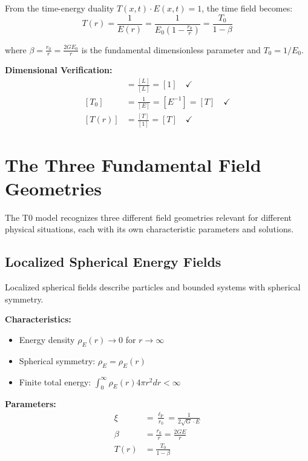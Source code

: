 \documentclass[12pt,a4paper]{report}
\newcommand{\lP}{\ell_{\text{P}}}         %
\newcommand{\rzero}{r_0}                  %
\begin{document}
	From the time-energy duality $T(x,t) \cdot E(x,t) = 1$, the time field becomes:
	\begin{equation}
		T(r) = \frac{1}{E(r)} = \frac{1}{E_0\left(1 - \frac{\rzero}{r}\right)} = \frac{T_0}{1 - \beta}
		\label{eq:time_field_solution}
	\end{equation}
	
	where $\beta = \frac{\rzero}{r} = \frac{2GE_0}{r}$ is the fundamental dimensionless parameter and $T_0 = 1/E_0$.
	
	\textbf{Dimensional Verification:}
	\begin{align}
		[\beta] &= \frac{[L]}{[L]} = [1] \quad \checkmark \\
		[T_0] &= \frac{1}{[E]} = [E^{-1}] = [T] \quad \checkmark \\
		[T(r)] &= \frac{[T]}{[1]} = [T] \quad \checkmark
	\end{align}
	
	\section{The Three Fundamental Field Geometries}\label{sec:three_field_geometries}
	
	The T0 model recognizes three different field geometries relevant for different physical situations, each with its own characteristic parameters and solutions.
	
	\subsection{Localized Spherical Energy Fields}\label{subsec:localized_spherical}
	
	Localized spherical fields describe particles and bounded systems with spherical symmetry.
	
	\textbf{Characteristics:}
	\begin{itemize}
		\item Energy density $\rho_E(r) \to 0$ for $r \to \infty$
		\item Spherical symmetry: $\rho_E = \rho_E(r)$
		\item Finite total energy: $\int_0^{\infty} \rho_E(r) 4\pi r^2 dr < \infty$
	\end{itemize}
	
	\textbf{Parameters:}
	\begin{align}
		\xi &= \frac{\lP}{\rzero} = \frac{1}{2\sqrt{G} \cdot E} \\
		\beta &= \frac{\rzero}{r} = \frac{2GE}{r} \\
		T(r) &= \frac{T_0}{1 - \beta}
	\end{align}
	
\end{document}
